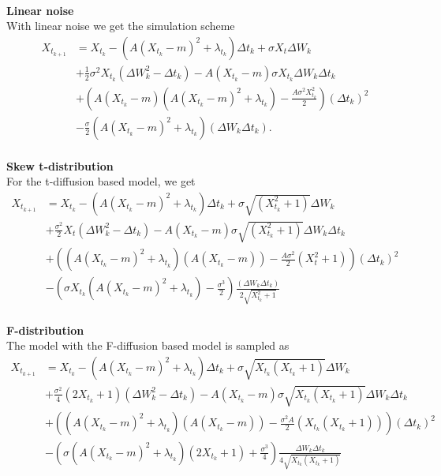 \\
\textbf{Linear noise}\\
With linear noise we get the simulation scheme
\begin{align}
    X_{t_{k + 1}} &= X_{t_k} - \left(A(X_{t_k} - m)^2 + \lambda_{t_k}\right) \Delta t_k + \sigma X_t \Delta W_{k} \nonumber \\ &
    + \frac{1}{2}\sigma^2 X_{t_k}\left(\Delta W_{k}^2 - \Delta t_k\right) -A(X_{t_k} - m)\sigma X_{t_k} \Delta W_k\Delta t_k \nonumber\\
    & + \left(A\left(X_{t_k} - m\right)\left(A\left(X_{t_k} - m\right)^2 + \lambda_{t_k}\right) - \frac{A\sigma^2X_{t_k}^2}{2}\right)(\Delta t_k)^2 \nonumber \\
    &- \frac{\sigma}{2}\left(A\left(X_{t_k} - m\right)^2 + \lambda_{t_k}\right)\left(\Delta W_{k}\Delta t_k\right).
\end{align}
\\
\textbf{Skew t-distribution}\\
For the t-diffusion based model, we get
\begin{align}
    X_{t_{k + 1}} &= X_{t_k} - \left(A(X_{t_k} - m)^2 + \lambda_{t_k}\right) \Delta t_k + \sigma \sqrt{\left(X_{t_k}^2 + 1\right)} \Delta W_{k} \nonumber\\
    &+ \frac{\sigma^2}{2}X_t \left(\Delta W_{k}^2 - \Delta t_k\right) - A\left(X_{t_k} - m \right)\sigma\sqrt{\left(X_{t_k}^2 + 1\right)}\Delta W_{k}\Delta t_k \nonumber\\
    &+ \left(\left(A\left(X_{t_k} - m \right)^2+\lambda_{t_k}\right)\left(A\left(X_{t_k} - m \right)\right) - \frac{A\sigma^2}{2}\left(X_t^2 + 1\right)\right)\left(\Delta t_k\right)^2 \nonumber\\
    &-\left(\sigma X_{t_k}\left(A\left(X_{t_k} - m \right)^2 + \lambda_{t_k}\right) - \frac{\sigma^3}{2}\right)\frac{\left(\Delta W_{k}\Delta t_k\right)}{2\sqrt{X_{t_k}^2 + 1}}
\end{align}
\\
\textbf{F-distribution}\\
The model with the F-diffusion based model is sampled as
\begin{align}
    X_{t_{k + 1}} &= X_{t_k} - \left(A(X_{t_k} - m)^2 + \lambda_{t_k}\right) \Delta t_k + \sigma\sqrt{X_{t_k}\left(X_{t_k} + 1\right)}\Delta W_k \nonumber \\
    &+ \frac{\sigma^2}{4}\left(2X_{t_k} + 1\right)\left(\Delta W_k^2 - \Delta t_k\right) - A \left(X_{t_k} - m\right)\sigma \sqrt{X_{t_k}\left(X_{t_k} + 1\right)}\Delta W_k \Delta t_k \nonumber \\
    &+ \left(\left(A\left(X_{t_k} - m\right)^2 + \lambda_{t_k}\right)\left(A\left(X_{t_k} - m\right)\right) - \frac{\sigma^2A}{2}\left(X_{t_k}\left(X_{t_k} + 1\right)\right)  \right)\left(\Delta t_k\right)^2 \nonumber \\
    &- \left(\sigma\left(A\left(X_{t_k} - m\right)^2 + \lambda_{t_k}\right)\left(2 X_{t_k} + 1\right) + \frac{\sigma^3}{4}\right)\frac{\Delta W_k \Delta t_k}{4\sqrt{X_{t_k}\left(X_{t_k} + 1\right)}}
\end{align}
